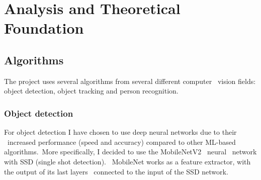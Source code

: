 
\chapter{Analysis and Theoretical Foundation}
\label{ch:analysis}

%

%
%
%

\section{Algorithms}
\label{sec:analysis-algorithms}
 The project uses several algorithms from several different computer \
vision fields: object detection, object tracking and person recognition.

\subsection{Object detection}
\label{subsec:analysis-object-detection}
For object detection I have chosen to use deep neural networks due to their \
increased performance (speed and accuracy) compared to other ML-based algorithms.\
More specifically, I decided to use the  MobileNetV2~\cite{mobilenet2} neural \
network with SSD (single shot detection). \
MobileNet works as a feature extractor, with the output of its last layers \
connected to the input of the SSD network.

